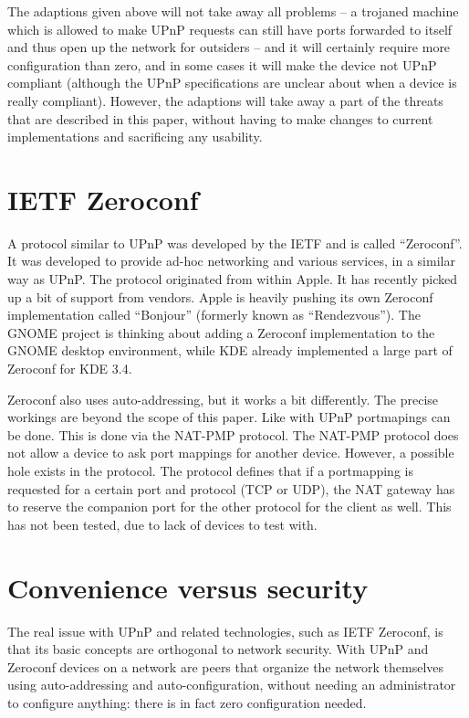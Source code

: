\documentclass[10pt]{article}
\begin{document}
The adaptions given above will not take away all problems -- a trojaned machine
which is allowed to make UPnP requests can still have ports forwarded to
itself and thus open up the network for outsiders -- and it will certainly
require more configuration than zero, and in some cases it will make the
device not UPnP compliant (although the UPnP specifications are unclear about
when a device is really compliant). However, the adaptions will take away a
part of the threats that are described in this paper, without having to make
changes to current implementations and sacrificing any usability.

\section{IETF Zeroconf}

A protocol similar to UPnP was developed by the IETF and is called
``Zeroconf''\cite{zeroconf}. It was developed to provide ad-hoc networking
and various services, in a similar way as UPnP. The protocol originated
from within Apple. It has recently picked up a bit of support from vendors.
Apple is heavily pushing its own Zeroconf implementation called ``Bonjour''
(formerly known as ``Rendezvous''). The GNOME project is thinking about
adding a Zeroconf implementation to the GNOME desktop environment, while
KDE already implemented a large part of Zeroconf for KDE 3.4.

Zeroconf also uses auto-addressing, but it works a bit differently. The
precise workings are beyond the scope of this paper. Like with UPnP
portmapings can be done. This is done via the NAT-PMP protocol. The NAT-PMP
protocol does not allow a device to ask port mappings for another device.
However, a possible hole exists in the protocol. The protocol defines that if
a portmapping is requested for a certain port and protocol (TCP or UDP), the
NAT gateway has to reserve the companion port for the other protocol for the
client as well. This has not been tested, due to lack of devices to test
with.


\section{Convenience versus security}

The real issue with UPnP and related technologies, such as IETF Zeroconf,
is that its basic concepts are orthogonal to network security. With UPnP and
Zeroconf devices on a network are peers that organize the network themselves
using auto-addressing and auto-configuration, without needing an administrator
to configure anything: there is in fact zero configuration needed.
\end{document}

